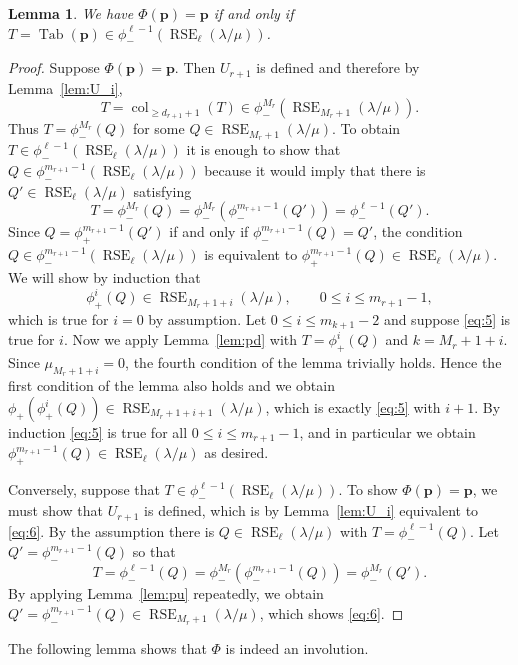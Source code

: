 \documentclass{amsart}
\numberwithin{equation}{section}
\newtheorem{lem}[thm]{Lemma}
\theoremstyle{definition}
\newcommand\Tab{\operatorname{Tab}}
\newcommand\col{\operatorname{col}}
\newcommand\pd{\phi_+}
\newcommand\pu{\phi_-}
\newcommand\RSE{\operatorname{RSE}}
\newcommand\pp{\mathbf{p}}
\newcommand\lm{{\lambda/\mu}}
\begin{document}
\begin{lem}\label{lem:fixed points}
We have $\Phi(\pp)=\pp$ if and only if $T=\Tab(\pp)\in \pu^{\ell-1}(\RSE_\ell(\lm))$.
\end{lem}
\begin{proof}
Suppose $\Phi(\pp)=\pp$. Then $U_{r+1}$ is defined and therefore by Lemma~\ref{lem:U_i},
\begin{equation}
  \label{eq:6}
  T=\col_{\ge d_{r+1}+1}(T)\in \pu^{M_{r}}(\RSE_{M_{r}+1}(\lm)).  
\end{equation}
Thus $T=\pu^{M_{r}}(Q)$ for some $Q\in\RSE_{M_{r}+1}(\lm)$. To obtain $T\in
\pu^{\ell-1}(\RSE_\ell(\lm))$ it is enough to show that
$Q\in\pu^{m_{r+1}-1}(\RSE_\ell(\lm))$ because it would imply that there is
$Q'\in\RSE_\ell(\lm)$ satisfying
\[
T=\pu^{M_{r}}(Q)=\pu^{M_{r}}(\pu^{m_{r+1}-1}(Q')) = \pu^{\ell-1}(Q'). 
\]
Since $Q=\pd^{m_{r+1}-1}(Q')$ if and only if $\pu^{m_{r+1}-1}(Q)=Q'$, the
condition $Q\in\pu^{m_{r+1}-1}(\RSE_\ell(\lm))$ is equivalent to
$\pd^{m_{r+1}-1}(Q)\in\RSE_\ell(\lm)$. We will show by induction that 
\begin{equation}
  \label{eq:5}
  \pd^{i}(Q)\in\RSE_{M_r+1+i}(\lm), \qquad  0\le i\le m_{r+1}-1, 
\end{equation}
which is true for $i=0$ by assumption. Let $0\le i\le m_{k+1}-2$ and suppose
\eqref{eq:5} is true for $i$. Now we apply Lemma~\ref{lem:pd} with
$T=\pd^{i}(Q)$ and $k=M_r+1+i$. Since $\mu_{M_r+1+i}=0$, the fourth condition
of the lemma trivially holds. Hence the first condition of the lemma also holds
and we obtain $\pd(\pd^{i}(Q))\in\RSE_{M_r+1+i+1}(\lm)$, which is exactly
\eqref{eq:5} with $i+1$. By induction \eqref{eq:5} is true for all $0\le i\le
m_{r+1}-1$, and in particular we obtain $\pd^{m_{r+1}-1}(Q)\in\RSE_\ell(\lm)$
as desired.

Conversely, suppose that $T\in \pu^{\ell-1}(\RSE_\ell(\lm))$. To show
$\Phi(\pp)=\pp$, we must show that $U_{r+1}$ is defined, which is by
Lemma~\ref{lem:U_i} equivalent to \eqref{eq:6}. By the assumption there is
$Q\in\RSE_\ell(\lm)$ with $T=\pu^{\ell-1}(Q)$. Let $Q'=\pu^{m_{r+1}-1}(Q)$
so that
\[
T=\pu^{\ell-1}(Q)= \pu^{M_{r}}(\pu^{m_{r+1}-1}(Q))=
\pu^{M_{r}}(Q'). 
\]
By applying Lemma~\ref{lem:pu} repeatedly, we obtain $Q'=\pu^{m_{r+1}-1}(Q)\in
\RSE_{M_r+1}(\lm)$, which shows \eqref{eq:6}.
\end{proof}

The following lemma shows that $\Phi$ is indeed an involution.
\end{document}

